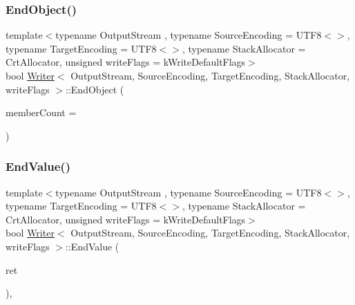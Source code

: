 \mbox{\label{classWriter_a0771a565261564c27676b7300b11f2b5}} 
\subsubsection{\texorpdfstring{End\+Object()}{EndObject()}}
{\footnotesize\ttfamily template$<$typename Output\+Stream , typename Source\+Encoding  = U\+T\+F8$<$$>$, typename Target\+Encoding  = U\+T\+F8$<$$>$, typename Stack\+Allocator  = Crt\+Allocator, unsigned write\+Flags = k\+Write\+Default\+Flags$>$ \\
bool \hyperlink{classWriter}{Writer}$<$ Output\+Stream, Source\+Encoding, Target\+Encoding, Stack\+Allocator, write\+Flags $>$\+::End\+Object (\begin{DoxyParamCaption}\item[{\hyperlink{rapidjson_8h_a5ed6e6e67250fadbd041127e6386dcb5}{Size\+Type}}]{member\+Count = {} }\end{DoxyParamCaption})\hspace{0.3cm}{\ttfamily [inline]}}

\mbox{\label{classWriter_adc1cadbabc309d31f19cf7463251d879}} 
\subsubsection{\texorpdfstring{End\+Value()}{EndValue()}}
{\footnotesize\ttfamily template$<$typename Output\+Stream , typename Source\+Encoding  = U\+T\+F8$<$$>$, typename Target\+Encoding  = U\+T\+F8$<$$>$, typename Stack\+Allocator  = Crt\+Allocator, unsigned write\+Flags = k\+Write\+Default\+Flags$>$ \\
bool \hyperlink{classWriter}{Writer}$<$ Output\+Stream, Source\+Encoding, Target\+Encoding, Stack\+Allocator, write\+Flags $>$\+::End\+Value (\begin{DoxyParamCaption}\item[{bool}]{ret }\end{DoxyParamCaption})\hspace{0.3cm}{\ttfamily [inline]}, {\ttfamily [protected]}}

\mbox{\label{classWriter_a8ca4e364c546b2eb526caa68dde011d2}} 
